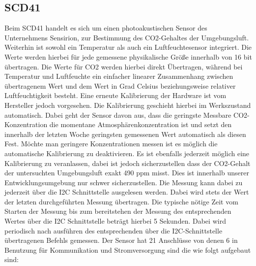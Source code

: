 \documentclass[]{article}
\begin{document}
		\subsection{SCD41}
		Beim SCD41 handelt es sich um einen photoakustischen Sensor des Unternehmens Sensirion, zur Bestimmung des CO2-Gehaltes der Umgebungsluft.\cite{scd_datasheet} Weiterhin ist sowohl ein Temperatur als auch ein Luftfeuchtesensor integriert. Die Werte werden hierbei für jede gemessene physikalische Größe innerhalb von 16 bit übertragen. Die Werte für CO2 werden hierbei direkt Übertragen, während bei Temperatur und Luftfeuchte ein einfacher linearer Zusammenhang zwischen übertragenem Wert und dem Wert in Grad Celsius beziehungsweise relativer Luftfeuchtigkeit besteht. Eine erneute Kalibrierung der Hardware ist vom Hersteller jedoch vorgesehen. Die Kalibrierung geschieht hierbei im Werkszustand automatisch. Dabei geht der Sensor davon aus, dass die geringste Messbare CO2-Konzentration die momentane Atmosphärenkonzentration ist und setzt den innerhalb der letzten Woche geringsten gemessenen Wert automatisch als diesen Fest. Möchte man geringere Konzentrationen messen ist es möglich die automatische Kalibrierung zu deaktivieren. Es ist ebenfalls jederzeit möglich eine Kalibrierung zu veranlassen, dabei ist jedoch sicherzustellen dass der CO2-Gehalt der untersuchten Umgebungsluft exakt 490 ppm misst. Dies ist innerhalb unserer Entwicklungsumgebung nur schwer sicherzustellen. Die Messung kann dabei zu jederzeit über die I2C Schnittstelle ausgelesen werden. Dabei wird stets der Wert der letzten durchgeführten Messung übertragen. Die typische nötige Zeit vom Starten der Messung bis zum bereitstehen der Messung des entsprechenden Wertes über die I2C Schnittstelle beträgt hierbei 5 Sekunden. Dabei wird periodisch nach ausführen des entsprechenden über die I2C-Schnittstelle übertragenen Befehls gemessen. Der Sensor hat 21 Anschlüsse von denen 6 in Benutzung für Kommunikation und Stromversorgung sind die wie folgt aufgebaut sind: 
		
\end{document}
